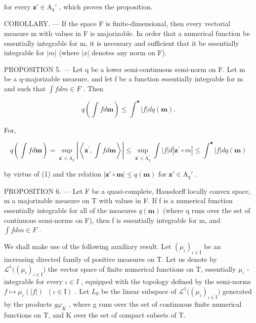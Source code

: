 for every \(\mathbf{z}' \in \mathrm{A}_q'\) , which proves the proposition.

COROLLARY. --- If the space F is finite-dimensional, then every vectorial measure m with values in F is majorizable. In order that a numerical function be essentially integrable for m, it is necessary and sufficient that it be essentially integrable for \(|m|\) (where \(|x|\) denotes any norm on F).

PROPOSITION 5. --- Let q be a lower semi-continuous semi-norm on F. Let m be a q-majorizable measure, and let f be a function essentially integrable for m and such that \(\int f dm \in F\) . Then

\[
q \left(\int f d \mathbf {m}\right) \leqslant \int^ {\bullet} | f | d q (\mathbf {m}).
\]

For,

\[
q \left(\int f d \mathbf {m}\right) = \sup _ {\mathbf {z} ^ {\prime} \in \mathrm{A} _ {q} ^ {\prime}} \left| \left\langle \mathbf {z} ^ {\prime}, \int f d \mathbf {m} \right\rangle \right| \leqslant \sup _ {\mathbf {z} ^ {\prime} \in \mathrm{A} _ {q} ^ {\prime}} \int | f | d | \mathbf {z} ^ {\prime} \circ m | \leqslant \int^ {\bullet} | f | d q (\mathbf {m})
\]

by virtue of (1) and the relation \(|\mathbf{z}' \circ \mathbf{m}| \leqslant q(\mathbf{m})\) for \(\mathbf{z}' \in \mathrm{A}_q'\) .

PROPOSITION 6. --- Let F be a quasi-complete, Hausdorff locally convex space, m a majorizable measure on T with values in F. If f is a numerical function essentially integrable for all of the measures \(q(\mathbf{m})\) (where q runs over the set of continuous semi-norms on F), then f is essentially integrable for m, and \(\int f dm \in F\) .

We shall make use of the following auxiliary result. Let \((\mu_{\iota})_{\iota\in\mathrm{I}}\) be an increasing directed family of positive measures on T. Let us denote by \(\mathcal{L}^{1}\big((\mu_{\iota})_{\iota\in\mathrm{I}}\big)\) the vector space of finite numerical functions on T, essentially \(\mu_{\iota}\) -integrable for every \(\iota\in I\) , equipped with the topology defined by the semi-norms \(f\mapsto\mu_{\iota}(|f|)\;\ (\iota\in\mathrm{I})\) . Let \(L_{0}\) be the linear subspace of \(\mathcal{L}^{1}\big((\mu_{\iota})_{\iota\in\mathrm{I}}\big)\) generated by the products \(g\varphi_{K}\) , where g runs over the set of continuous finite numerical functions on T, and K over the set of compact subsets of T.

